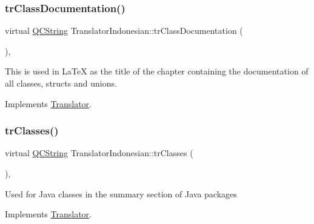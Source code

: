 \mbox{\label{class_translator_indonesian_ab03441d90ba4b02fe7e4df70d3f8f8e5}} 
\subsubsection{\texorpdfstring{trClassDocumentation()}{trClassDocumentation()}}
{\footnotesize\ttfamily virtual \mbox{\hyperlink{class_q_c_string}{Q\+C\+String}} Translator\+Indonesian\+::tr\+Class\+Documentation (\begin{DoxyParamCaption}{ }\end{DoxyParamCaption})\hspace{0.3cm}{\ttfamily [inline]}, {\ttfamily [virtual]}}

This is used in La\+TeX as the title of the chapter containing the documentation of all classes, structs and unions. 

Implements \mbox{\hyperlink{class_translator}{Translator}}.

\mbox{\label{class_translator_indonesian_a779c7ef6d81e2be3397f0d4cde632239}} 
\subsubsection{\texorpdfstring{trClasses()}{trClasses()}}
{\footnotesize\ttfamily virtual \mbox{\hyperlink{class_q_c_string}{Q\+C\+String}} Translator\+Indonesian\+::tr\+Classes (\begin{DoxyParamCaption}{ }\end{DoxyParamCaption})\hspace{0.3cm}{\ttfamily [inline]}, {\ttfamily [virtual]}}

Used for Java classes in the summary section of Java packages 

Implements \mbox{\hyperlink{class_translator}{Translator}}.

\mbox{\label{class_translator_indonesian_acb7feadcd21fde3f813f85765ef6e00e}} 
